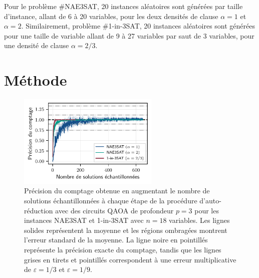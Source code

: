 Pour le problème \#NAE3SAT, 20 instances aléatoires sont générées par taille d'instance, allant de 6 à 20 variables, pour les deux densités de clause $\alpha=1$ et $\alpha = 2$. Similairement, problème \#1-in-3SAT, 20 instances aléatoires sont générées pour une taille de variable allant de 9 à 27 variables par saut de 3 variables, pour une densité de clause $\alpha = 2/3$. 


\section{Méthode}
\label{sec:methode}
\begin{figure}[H]
    \centering
    \includegraphics[width=0.6\textwidth]{figures/count-accuracy.pdf}
    \caption[Précision du comptage pour des problèmes \textsf{\#P}-difficile]{Précision du comptage obtenue en augmentant le nombre de solutions échantillonnées à chaque étape de la procédure d'auto-réduction avec des circuits QAOA de profondeur $p=3$ pour les instances NAE3SAT et 1-in-3SAT avec $n=18$ variables. Les lignes solides représentent la moyenne et les régions ombragées montrent l'erreur standard de la moyenne. La ligne noire en pointillés représente la précision exacte du comptage, tandis que les lignes grises en tirets et pointillés correspondent à une erreur multiplicative de $\varepsilon = 1/3$ et $\varepsilon = 1/9$.}
    \label{fig:count-accuracy.pdf}
\end{figure}

